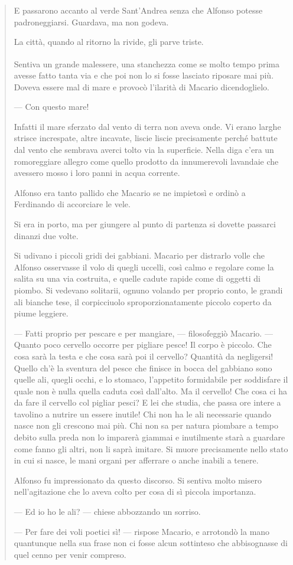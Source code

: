 \documentclass[a4paper, twoside, titlepage]{book}
\newcounter{mar}
\newcommand{\mar}[2]{
\addtocounter{mar}{1}
\hspace{-0.73em}\textsuperscript{\hyperref[\thechapter.\themar]{\themar}}\marginpar{{\small\textbf{\themar}\label{\thechapter.\themar}. #2}}\hspace{-0.4em}
}
\newcommand{\mat}[1]{\mar{gg}{#1}}
\begin{document}
\begin{quotation}
E passarono accanto al verde Sant’Andrea senza che Alfonso potesse padroneggiarsi. Guardava, ma non godeva.

La città, quando al ritorno la rivide, gli parve triste.\mat{malattia} Sentiva un grande malessere, una stanchezza come se molto tempo prima avesse fatto tanta via e che poi non lo si fosse lasciato riposare mai più. Doveva essere mal di mare e provocò l’ilarità di Macario dicendoglielo.

— Con questo mare!

Infatti il mare sferzato dal vento di terra non aveva onde. Vi erano larghe strisce increspate, altre incavate, liscie liscie precisamente perché battute dal vento che sembrava averci tolto via la superficie. Nella diga c’era un romoreggiare allegro come quello prodotto da innumerevoli lavandaie che avessero mosso i loro panni in acqua corrente.

Alfonso era tanto pallido che Macario se ne impietosì e ordinò a Ferdinando di accorciare le vele.

Si era in porto, ma per giungere al punto di partenza si dovette passarci dinanzi due volte.

Si udivano i piccoli gridi dei gabbiani. Macario per distrarlo volle che Alfonso osservasse il volo di quegli uccelli, così calmo e regolare come la salita su una via costruita, e quelle cadute rapide come di oggetti di piombo. Si vedevano solitarii, ognuno volando per proprio conto, le grandi ali bianche tese, il corpicciuolo sproporzionatamente piccolo coperto da piume leggiere.

— Fatti proprio per pescare e per mangiare, — filosofeggiò Macario. — Quanto poco cervello occorre per pigliare pesce! Il corpo è piccolo. Che cosa sarà la testa e che cosa sarà poi il cervello? Quantità da negligersi! Quello ch’è la sventura del pesce che finisce in bocca del gabbiano sono quelle ali, quegli occhi, e lo stomaco, l’appetito formidabile per soddisfare il quale non è nulla quella caduta così dall’alto. Ma il cervello! Che cosa ci ha da fare il cervello col pigliar pesci? E lei che studia, che passa ore intere a tavolino a nutrire un essere inutile! Chi non ha le ali necessarie quando nasce non gli crescono mai più. Chi non sa per natura piombare a tempo debito sulla preda non lo imparerà giammai e inutilmente starà a guardare come fanno gli altri, non li saprà imitare. Si muore precisamente nello stato in cui si nasce, le mani organi per afferrare o anche inabili a tenere.

Alfonso fu impressionato da questo discorso. Si sentiva molto misero nell’agitazione che lo aveva colto per cosa di sì piccola importanza.

— Ed io ho le ali? — chiese abbozzando un sorriso.

— Per fare dei voli poetici sì! — rispose Macario, e arrotondò la mano quantunque nella sua frase non ci fosse alcun sottinteso che abbisognasse di quel cenno per venir compreso.
\end{quotation}
\end{document}

